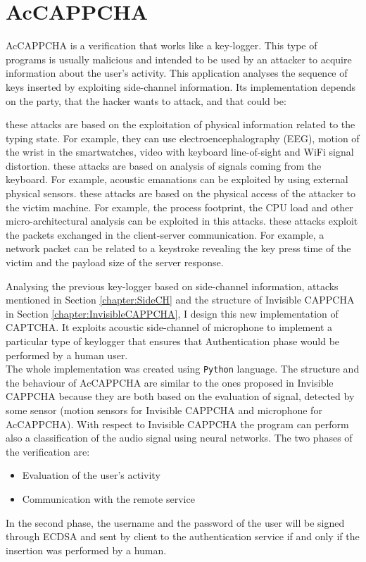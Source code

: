 \chapter{AcCAPPCHA}
AcCAPPCHA is a verification that works like a key-logger. This type of programs is usually malicious and intended to be used by an attacker to acquire information about the user's activity. This application analyses the sequence of keys inserted by exploiting side-channel information. Its implementation depends on the party, that the hacker wants to attack\cite{keylogging}, and that could be:
\begin{itemize}
{these attacks are based on the exploitation of physical information related to the typing state. For example, they can use electroencephalography (EEG), motion of the wrist in the smartwatches, video with keyboard line-of-sight and WiFi signal distortion.}
{these attacks are based on analysis of signals coming from the keyboard. For example, acoustic emanations can be exploited by using external physical sensors.}
{these attacks are based on the physical access of the attacker to the victim machine. For example, the process footprint, the CPU load and other micro-architectural analysis can be exploited in this attacks.}
{these attacks exploit the packets exchanged in the client-server communication. For example, a network packet can be related to a keystroke revealing the key press time of the victim and the payload size of the server response.}
\end{itemize}
Analysing the previous key-logger based on side-channel information, attacks mentioned in Section \ref{chapter:SideCH} and the structure of Invisible CAPPCHA in Section \ref{chapter:InvisibleCAPPCHA}, I design this new implementation of CAPTCHA. It exploits acoustic side-channel of microphone to implement a particular type of keylogger that ensures that Authentication phase would be performed by a human user.\\
The whole implementation was created using \texttt{Python} language. The structure and the behaviour of AcCAPPCHA are similar to the ones proposed in Invisible CAPPCHA because they are both based on the evaluation of signal, detected by some sensor (motion sensors for Invisible CAPPCHA and microphone for AcCAPPCHA). With respect to Invisible CAPPCHA the program can perform also a classification of the audio signal using neural networks. The two phases of the verification are:
\begin{itemize}
\item{Evaluation of the user's activity}
\item{Communication with the remote service}
\end{itemize}
In the second phase, the username and the password of the user will be signed through ECDSA and sent by client to the authentication service if and only if the insertion was performed by a human.


